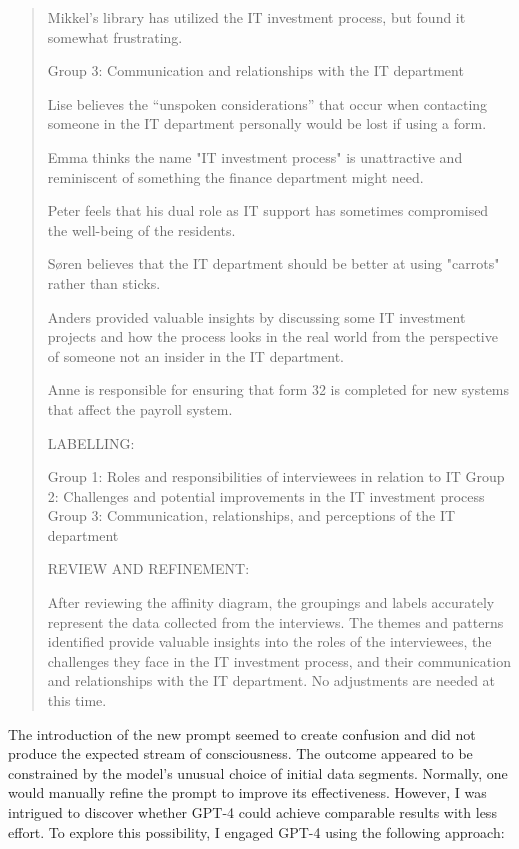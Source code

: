 \documentclass[
]{book}
\begin{document}
\begin{quote}
Mikkel's library has utilized the IT investment process, but found it somewhat frustrating.

Group 3: Communication and relationships with the IT department

Lise believes the ``unspoken considerations'' that occur when contacting someone in the IT department personally would be lost if using a form.

Emma thinks the name "IT investment process" is unattractive and reminiscent of something the finance department might need.

Peter feels that his dual role as IT support has sometimes compromised the well-being of the residents.

Søren believes that the IT department should be better at using "carrots" rather than sticks.

Anders provided valuable insights by discussing some IT investment projects and how the process looks in the real world from the perspective of someone not an insider in the IT department.

Anne is responsible for ensuring that form 32 is completed for new systems that affect the payroll system.

LABELLING:

Group 1: Roles and responsibilities of interviewees in relation to IT Group 2: Challenges and potential improvements in the IT investment process Group 3: Communication, relationships, and perceptions of the IT department

REVIEW AND REFINEMENT:

After reviewing the affinity diagram, the groupings and labels accurately represent the data collected from the interviews. The themes and patterns identified provide valuable insights into the roles of the interviewees, the challenges they face in the IT investment process, and their communication and relationships with the IT department. No adjustments are needed at this time.
\end{quote}

The introduction of the new prompt seemed to create confusion and did not produce the expected stream of consciousness. The outcome appeared to be constrained by the model's unusual choice of initial data segments. Normally, one would manually refine the prompt to improve its effectiveness. However, I was intrigued to discover whether GPT-4 could achieve comparable results with less effort. To explore this possibility, I engaged GPT-4 using the following approach:
\end{document}
